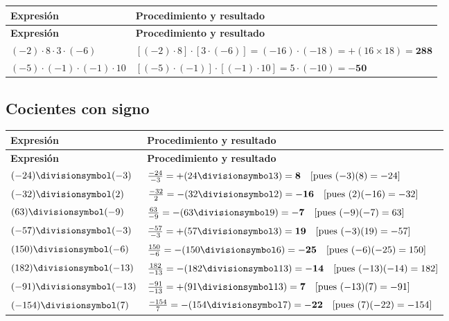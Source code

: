 \documentclass[spanish,letterpaper,oneside]{article}
\let\div\divisionsymbol
\begin{document}
{\small{}\renewcommand{\arraystretch}{1.28}
\begin{longtable}{|>{\raggedright\arraybackslash}p{}|>{\raggedright\arraybackslash}p{}|}\hline
\rowcolor{iiiepePale} \textbf{Expresión} & \textbf{Procedimiento y resultado} \\\hline
\endfirsthead
\hline
\rowcolor{iiiepePale} \textbf{Expresión} & \textbf{Procedimiento y resultado} \\\hline
\endhead
$(-2)\cdot8\cdot3\cdot(-6)$ & $[(-2)\cdot 8]\cdot[3\cdot(-6)] = (-16)\cdot(-18) = +(16\times 18) = \mathbf{288}$ \\\hline
$(-5)\cdot(-1)\cdot(-1)\cdot10$ & $[(-5)\cdot(-1)]\cdot[(-1)\cdot 10] = 5\cdot(-10) = \mathbf{-50}$ \\\hline
\end{longtable}}

\subsection*{Cocientes con signo}


{\small{}\renewcommand{\arraystretch}{1.45}
\begin{longtable}{|>{\raggedright\arraybackslash}p{}|>{\raggedright\arraybackslash}p{}|}\hline
\rowcolor{iiiepePale} \textbf{Expresión} & \textbf{Procedimiento y resultado} \\\hline
\endfirsthead
\hline
\rowcolor{iiiepePale} \textbf{Expresión} & \textbf{Procedimiento y resultado} \\\hline
\endhead
$(-24)\div(-3)$ & $\frac{-24}{-3} = +(24\div 3) = \mathbf{8}\quad [\text{pues }(-3)(8)=-24]$ \\\hline
$(-32)\div(2)$ & $\frac{-32}{2} = -(32\div 2) = \mathbf{-16}\quad [\text{pues }(2)(-16)=-32]$ \\\hline
$(63)\div(-9)$ & $\frac{63}{-9} = -(63\div 9) = \mathbf{-7}\quad [\text{pues }(-9)(-7)=63]$ \\\hline
$(-57)\div(-3)$ & $\frac{-57}{-3} = +(57\div 3) = \mathbf{19}\quad [\text{pues }(-3)(19)=-57]$ \\\hline
$(150)\div(-6)$ & $\frac{150}{-6} = -(150\div 6) = \mathbf{-25}\quad [\text{pues }(-6)(-25)=150]$ \\\hline
$(182)\div(-13)$ & $\frac{182}{-13} = -(182\div 13) = \mathbf{-14}\quad [\text{pues }(-13)(-14)=182]$ \\\hline
$(-91)\div(-13)$ & $\frac{-91}{-13} = +(91\div 13) = \mathbf{7}\quad [\text{pues }(-13)(7)=-91]$ \\\hline
$(-154)\div(7)$ & $\frac{-154}{7} = -(154\div 7) = \mathbf{-22}\quad [\text{pues }(7)(-22)=-154]$ \\\hline
\end{longtable}}
\end{document}
